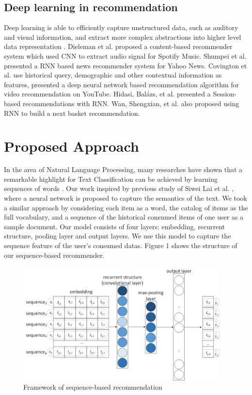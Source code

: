 \documentclass[runningheads]{llncs}
\begin{document}
\subsection{Deep learning in recommendation}
Deep learning is able to efficiently capture unstructured data, such as auditory and visual information, and extract more complex abstractions into higher level data representation \cite{20}. Dieleman et al. \cite{8} proposed a content-based recommender system which used CNN to extract audio signal for Spotify Music. Shumpei et al. \cite{9} presented a RNN based news recommender system for Yahoo News. Covington et al. \cite{10} use historical query, demographic and other contextual information as features, presented a deep neural network based recommendation algorithm for video recommendation on YouTube. Hidasi, Balázs, et al. \cite{11} presented a Session-based recommendations with RNN. Wan, Shengxian, et al. \cite{15} also proposed using RNN to build a next basket recommendation.

\section{Proposed Approach}

In the area of Natural Language Processing, many researches have shown that a remarkable highlight for Text Classification can be achieved by learning sequences of words \cite{21}. Our work inspired by previous study of Siwei Lai et al. \cite{13}, where a neural network is proposed to capture the semantics of the text. We took a similar approach by considering each item as a word, the catalog of items as the full vocabulary, and a sequence of the historical consumed items of one user as a sample document. Our model consists of four layers: embedding, recurrent structure, pooling layer and output layers. We use this model to capture the sequence feature of the user's consumed datas. Figure 1 shows the structure of our sequence-based recommender.
\begin{figure}[htbp]
\centerline
{\includegraphics[height=6.2cm,width=\linewidth]{image/structer.jpg}}
\caption{Framework of sequence-based recommendation }
\end{figure}
\end{document}

